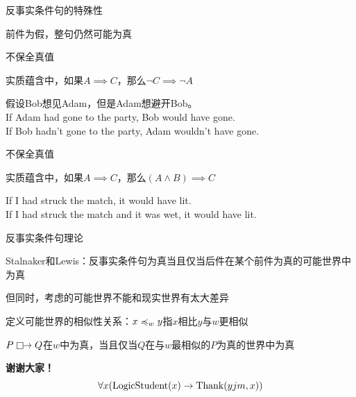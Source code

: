 \documentclass{zhslides}
\begin{document}
\begin{frame}{反事实条件句的特殊性}
  
  \bit
    \item 前件为假，整句仍然可能为真
    \item {}不保全真值
      \bit
        \item 实质蕴含中，如果$A \implies C$，那么$\neg C \implies \neg A$
        \item 假设Bob想见Adam，但是Adam想避开Bob。\\
              If Adam had gone to the party, Bob would have gone.\\
              If Bob hadn't gone to the party, Adam wouldn't have gone.
      \eit
    \item {}不保全真值
      \bit
        \item 实质蕴含中，如果$A \implies C$，那么$(A \land B) \implies C$
        \item If I had struck the match, it would have lit.\\
              If I had struck the match and it was wet, it would have lit.
      \eit
  \eit
  
\end{frame}


\begin{frame}{反事实条件句理论}
  
  \bit
    \item Stalnaker和Lewis：反事实条件句为真当且仅当后件在某个前件为真的可能世界中为真
    \item 但同时，考虑的可能世界不能和现实世界有太大差异
    \item 定义可能世界的相似性关系：$x \preccurlyeq_w y$指$x$相比$y$与$w$更相似
    \item $P \mathrel{\mathop\Box}\mathrel{\mkern-2.5mu}\rightarrow Q$在$w$中为真，当且仅当$Q$在与$w$最相似的$P$为真的世界中为真
  \eit
  
\end{frame}


\begin{frame}

  \textbf{\LARGE{\centering 谢谢大家！}}
  \[ \forall x (\operatorname{LogicStudent}(x) \rightarrow \operatorname{Thank}(yjm, x)) \]

\end{frame}
\end{document}
